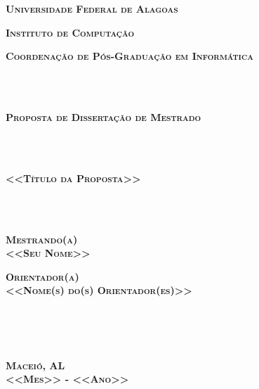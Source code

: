 \documentclass[a4paper,titlepage,12pt]{article}
\begin{document}

\pagestyle{empty}

\begin{center}
{\textbf{\Large \textsc{Universidade Federal de Alagoas}}}
\end{center}

\begin{center}
\textbf{{\Large \textsc{Instituto de Computação}}}
\end{center}

\begin{center}
{\large \textsc{\textbf{Coordenação de Pós-Graduação em Informática}}}
\end{center}

~\\ \\

\begin{center}
{\LARGE \textsc{\textbf{Proposta de Dissertação de
Mestrado}}}
\end{center}

~\\ \\

\begin{center}
{\Large \textsc{\textbf{<<Título da Proposta>>}}}
\end{center}

~\\ \\

\begin{center}
\textbf{\textsc{Mestrando(a)} \\
\textsc{<<Seu Nome>>}}
\end{center}

\begin{center}
\textbf{\textsc{Orientador(a)} \\
\textsc{<<Nome(s) do(s) Orientador(es)>>}}
\end{center}

~\\ \\ \\

\begin{center}
\textbf{{\large \textsc{Maceió, AL}}
\\
{\large \textsc{<<Mes>> - <<Ano>>}}}
\end{center}

\newpage
\cleardoublepage
\end{document}
